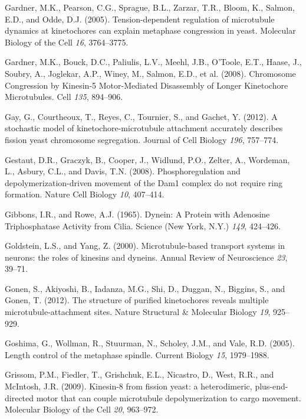\documentclass[12pt,a4paper,twoside,openright]{book}
\begin{document}
\hypertarget{ref-Gardner2005}{}
Gardner, M.K., Pearson, C.G., Sprague, B.L., Zarzar, T.R., Bloom, K.,
Salmon, E.D., and Odde, D.J. (2005). Tension-dependent regulation of
microtubule dynamics at kinetochores can explain metaphase congression
in yeast. Molecular Biology of the Cell \emph{16}, 3764--3775.

\hypertarget{ref-Gardner2008a}{}
Gardner, M.K., Bouck, D.C., Paliulis, L.V., Meehl, J.B., O'Toole, E.T.,
Haase, J., Soubry, A., Joglekar, A.P., Winey, M., Salmon, E.D., et al.
(2008). Chromosome Congression by Kinesin-5 Motor-Mediated Disassembly
of Longer Kinetochore Microtubules. Cell \emph{135}, 894--906.

\hypertarget{ref-Gay2012a}{}
Gay, G., Courtheoux, T., Reyes, C., Tournier, S., and Gachet, Y. (2012).
A stochastic model of kinetochore-microtubule attachment accurately
describes fission yeast chromosome segregation. Journal of Cell Biology
\emph{196}, 757--774.

\hypertarget{ref-Gestaut2008}{}
Gestaut, D.R., Graczyk, B., Cooper, J., Widlund, P.O., Zelter, A.,
Wordeman, L., Asbury, C.L., and Davis, T.N. (2008). Phosphoregulation
and depolymerization-driven movement of the Dam1 complex do not require
ring formation. Nature Cell Biology \emph{10}, 407--414.

\hypertarget{ref-Gibbons1965}{}
Gibbons, I.R., and Rowe, A.J. (1965). Dynein: A Protein with Adenosine
Triphosphatase Activity from Cilia. Science (New York, N.Y.) \emph{149},
424--426.

\hypertarget{ref-Goldstein2000}{}
Goldstein, L.S., and Yang, Z. (2000). Microtubule-based transport
systems in neurons: the roles of kinesins and dyneins. Annual Review of
Neuroscience \emph{23}, 39--71.

\hypertarget{ref-Gonen2012a}{}
Gonen, S., Akiyoshi, B., Iadanza, M.G., Shi, D., Duggan, N., Biggins,
S., and Gonen, T. (2012). The structure of purified kinetochores reveals
multiple microtubule-attachment sites. Nature Structural \& Molecular
Biology \emph{19}, 925--929.

\hypertarget{ref-Goshima2005}{}
Goshima, G., Wollman, R., Stuurman, N., Scholey, J.M., and Vale, R.D.
(2005). Length control of the metaphase spindle. Current Biology
\emph{15}, 1979--1988.

\hypertarget{ref-Grissom2009}{}
Grissom, P.M., Fiedler, T., Grishchuk, E.L., Nicastro, D., West, R.R.,
and McIntosh, J.R. (2009). Kinesin-8 from fission yeast: a
heterodimeric, plus-end-directed motor that can couple microtubule
depolymerization to cargo movement. Molecular Biology of the Cell
\emph{20}, 963--972.
\end{document}
